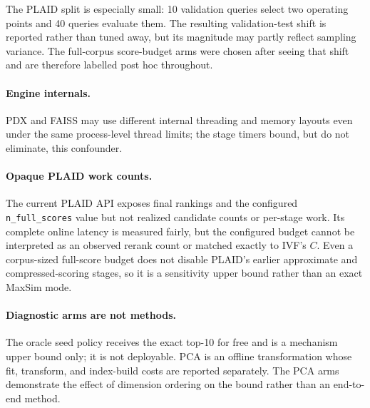 The PLAID split is especially small: 10 validation queries select two
operating points and 40 queries evaluate them. The resulting validation-test
shift is reported rather than tuned away, but its magnitude may partly reflect
sampling variance. The full-corpus score-budget arms were chosen after seeing
that shift and are therefore labelled post hoc throughout.

\paragraph{Engine internals.}
PDX and FAISS may use different internal threading and memory layouts even
under the same process-level thread limits; the stage timers bound, but do not
eliminate, this confounder.

\paragraph{Opaque PLAID work counts.}
The current PLAID API exposes final rankings and the configured
\texttt{n\_full\_scores} value but not realized candidate counts or per-stage
work. Its complete online latency is measured fairly, but the configured
budget cannot be interpreted as an observed rerank count or matched exactly to
IVF's $C$. Even a corpus-sized full-score budget does not disable PLAID's
earlier approximate and compressed-scoring stages, so it is a sensitivity
upper bound rather than an exact MaxSim mode.

\paragraph{Diagnostic arms are not methods.}
The oracle seed policy receives the exact top-10 for free and is a mechanism
upper bound only; it is not deployable. PCA is an offline transformation whose
fit, transform, and index-build costs are reported separately. The PCA arms
demonstrate the effect of dimension ordering on the bound rather than an
end-to-end method.
